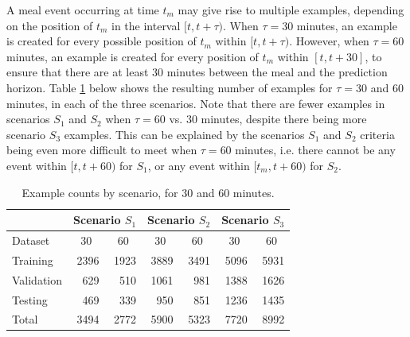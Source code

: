\documentclass{ecai}
\begin{document}
A meal event occurring at time $t_m$ may give rise to multiple examples, depending on the position of $t_m$ in the interval $[t, t+\tau)$. When $\tau = 30$ minutes, an example is created for every possible position of $t_m$ within $[t, t+\tau)$. However, when $\tau = 60$ minutes, an example is created for every position of $t_m$ within $[t, t+30]$, to ensure that there are at least 30 minutes between the meal and the prediction horizon. Table \ref{tab:examples} below shows the resulting number of examples for $\tau = 30$ and 
$60$ minutes, in each of the three scenarios. Note that there are fewer examples in scenarios $S_1$ and $S_2$ when $\tau = 60$ vs. $30$ minutes, despite there being more scenario $S_3$ examples. This can be explained by the scenarios $S_1$ and $S_2$ criteria being even more difficult to meet when $\tau = 60$ minutes, i.e. there cannot be any event within $[t, t+60)$ for $S_1$, or any event within $[t_m, t+60)$ for $S_2$.


\begin{table}
\begin{center}
\caption{Example counts by scenario, for 30 and 60 minutes.}
\label{tab:examples}
\begin{tabular}{|l|r|r|r|r|r|r|}
	\cline{2-7}
	\multicolumn{1}{c}{} & \multicolumn{2}{|c}{Scenario $S_1$} & \multicolumn{2}{|c}{Scenario $S_2$} & \multicolumn{2}{|c|}{Scenario $S_3$}\\
	\hline
	Dataset & \multicolumn{1}{c|}{30} & \multicolumn{1}{c|}{60} & \multicolumn{1}{c|}{30} & \multicolumn{1}{c|}{60} & \multicolumn{1}{c|}{30} & \multicolumn{1}{c|}{60}\\
	\hline
	Training & 2396 & 1923 & 3889 & 3491 & 5096 & 5931\\
	Validation & 629 & 510 & 1061 & 981 & 1388 & 1626\\
	Testing & 469 & 339 & 950 & 851 & 1236 & 1435\\
	\hline
	Total & 3494 & 2772 & 5900 & 5323 & 7720 & 8992\\
	\hline
\end{tabular}
\end{center}
\end{table}

\end{document}
